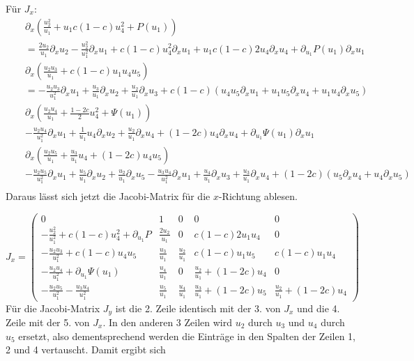 Für $J_x$:
\begin{eqnarray*}
&& \partial_x (\frac{u_2^2}{u_1} + u_1 c (1-c) u_4^2 + P(u_1))\\
&& = \frac{2 u_2}{u_1} \partial_x u_2
                    - \frac{u_2^2}{u_1^2} \partial_x u_1
                    + c (1-c) u_4^2  \partial_x u_1
                    + u_1 c (1-c) 2 u_4  \partial_x u_4
                    + \partial_{u_1}P(u_1) \partial_x u_1\\
&& \partial_x (\frac{u_2u_3}{u_1} + c(1-c) u_1 u_{4} u_{5})\\
&& = - \frac{u_2u_3}{u_1^2} \partial_x u_1 + \frac{u_3}{u_1} \partial_x u_2
     + \frac{u_2}{u_1} \partial_x u_3     
     + c (1-c) (u_4 u_5  \partial_x u_1 + u_1 u_5  \partial_x u_4
                + u_1 u_4  \partial_x u_5)
\\
&& \partial_x (\frac{u_2 u_4}{u_1} + \frac{1-2c}{2}
                    u_4^2 + \Psi(u_1))\\
&& - \frac{u_2 u_4}{u_1^2}  \partial_x u_1
                    + \frac{1}{u_1} u_4 \partial_x u_2
                    + \frac{u_2}{u_1} \partial_x u_4 
                    + (1-2c) u_4 \partial_x u_4 
                    + \partial_{u_1}\Psi(u_1) \partial_x u_1\\
&& \partial_x (\frac{u_2 u_{5}}{u_1} + \frac{u_3}{u_1}u_{4} + (1-2c)u_{4}u_{5})\\
&& - \frac{u_2 u_5}{u_1^2} \partial_x u_1 + \frac{u_5}{u_1} \partial_x u_2
   + \frac{u_2}{u_1} \partial_x u_5
   - \frac{u_3 u_4}{u_1^2} \partial_x u_1 + \frac{u_4}{u_1} \partial_x u_3
   + \frac{u_3}{u_1} \partial_x u_4
   + (1-2c)(u_{5}\partial_x u_{4} + u_{4}\partial_x u_{5})
\\
\end{eqnarray*}
Daraus lässt sich jetzt die Jacobi-Matrix für die $x$-Richtung ablesen.

\begin{equation}
J_x = \left(\begin{array}{ccccc}
  0 & 1 & 0 & 0 & 0\\
 - \frac{u_2^2}{u_1^2} + c(1-c) u_4^2 + \partial_{u_1} P & \frac{2 u_2}{u_1} &  
 0 & c (1-c) 2 u_1 u_4 & 0 \\
 - \frac{u_2u_3}{u_1^2} +  c (1-c) u_4 u_5 & \frac{u_3}{u_1}  & \frac{u_2}{u_1} &
 c (1-c) u_1 u_5 & c (1-c)  u_1 u_4 \\
- \frac{u_2 u_4}{u_1^2} + \partial_{u_1} \Psi(u_1) &  \frac{u_4}{u_1}  & 0 &
 \frac{u_2}{u_1} + (1-2c) u_4 & 0\\
- \frac{u_2 u_5}{u_1^2} - \frac{u_3 u_4}{u_1^2} & \frac{u_5}{u_1} &
\frac{u_4}{u_1} & \frac{u_3}{u_1} + (1-2c) u_{5} & \frac{u_2}{u_1} + (1-2c)u_{4}
\end{array}\right)\qquad\label{eq:jacobi_x_2d_allgemein}
\end{equation}
Für die Jacobi-Matrix $J_y$ ist die 2. Zeile identisch mit der 3. von
$J_x$ und die 4. Zeile mit der 5. von $J_x$. In den anderen 3 Zeilen
wird $u_2$ durch $u_3$ und $u_4$ durch $u_5$ ersetzt, also
dementsprechend werden die Einträge in den Spalten der Zeilen 1, 2 und
4 vertauscht. Damit ergibt sich

